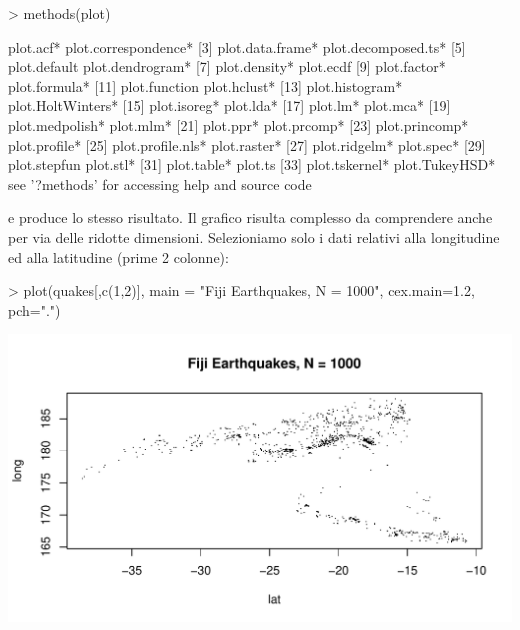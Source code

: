 \documentclass[onecolumn,11pt]{book}
\begin{document}
\begin{Schunk}
\begin{Sinput}
> methods(plot)
\end{Sinput}
\begin{Soutput}
 [1] plot.acf*            plot.correspondence*
 [3] plot.data.frame*     plot.decomposed.ts* 
 [5] plot.default         plot.dendrogram*    
 [7] plot.density*        plot.ecdf           
 [9] plot.factor*         plot.formula*       
[11] plot.function        plot.hclust*        
[13] plot.histogram*      plot.HoltWinters*   
[15] plot.isoreg*         plot.lda*           
[17] plot.lm*             plot.mca*           
[19] plot.medpolish*      plot.mlm*           
[21] plot.ppr*            plot.prcomp*        
[23] plot.princomp*       plot.profile*       
[25] plot.profile.nls*    plot.raster*        
[27] plot.ridgelm*        plot.spec*          
[29] plot.stepfun         plot.stl*           
[31] plot.table*          plot.ts             
[33] plot.tskernel*       plot.TukeyHSD*      
see '?methods' for accessing help and source code
\end{Soutput}
\end{Schunk}
e produce lo stesso risultato.
Il grafico risulta complesso da comprendere anche per via delle ridotte dimensioni. Selezioniamo solo i dati relativi alla longitudine ed alla latitudine (prime 2 colonne):
\begin{Schunk}
\begin{Sinput}
>  plot(quakes[,c(1,2)], main = "Fiji Earthquakes, N = 1000", cex.main=1.2, pch=".")
\end{Sinput}
\end{Schunk}
\includegraphics{statisticaconR-349}
\end{document}
